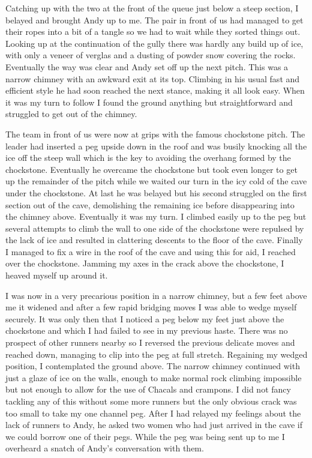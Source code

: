\documentclass[a5paper,openany,font 10pt]{scrbook}
\begin{document}
Catching up with the two at the front of the queue just
below a steep section, I belayed and brought Andy up to me. The
pair in front of us had managed to get their ropes into a bit of
a tangle so we had to wait while they sorted things out. Looking
up at the continuation of the gully there was hardly any build up
of ice, with only a veneer of verglas and a dusting of powder
snow covering the rocks. Eventually the way was clear and Andy
set off up the next pitch. This was a narrow chimney with an
awkward exit at its top. Climbing in his usual fast and efficient
style he had soon reached the next stance, making it all look
easy. When it was my turn to follow I found the ground anything
but straightforward and struggled to get out of the chimney.

The team in front of us were now at grips with the famous
chockstone pitch. The leader had inserted a peg upside down in
the roof and was busily knocking all the ice off the steep wall
which is the key to avoiding the overhang formed by the
chockstone. Eventually he overcame the chockstone but took even
longer to get up the remainder of the pitch while we waited our
turn in the icy cold of the cave under the chockstone. At last he
was belayed but his second struggled on the first section out of
the cave, demolishing the remaining ice before disappearing into
the chimney above. Eventually it was my turn. I climbed easily up
to the peg but several attempts to climb the wall to one side of
the chockstone were repulsed by the lack of ice and resulted in
clattering descents to the floor of the cave. Finally I managed
to fix a wire in the roof of the cave and using this for aid, I
reached over the chockstone. Jamming my axes in the crack above
the chockstone, I heaved myself up around it.

I was now in a very precarious position in a narrow chimney,
but a few feet above me it widened and after a few rapid bridging
moves I was able to wedge myself securely. It was only then that
I noticed a peg below my feet just above the chockstone and which
I had failed to see in my previous haste. There was no prospect
of other runners nearby so I reversed the previous delicate moves
and reached down, managing to clip into the peg at full stretch.
Regaining my wedged position, I contemplated the ground above.
The narrow chimney continued with just a glaze of ice on the
walls, enough to make normal rock climbing impossible but not
enough to allow for the use of Chacals and crampons. I did not
fancy tackling any of this without some more runners but the only
obvious crack was too small to take my one channel peg. After I
had relayed my feelings about the lack of runners to Andy, he
asked two women who had just arrived in the cave if we could
borrow one of their pegs. While the peg was being sent up to me I
overheard a snatch of Andy's conversation with them.
\end{document}
